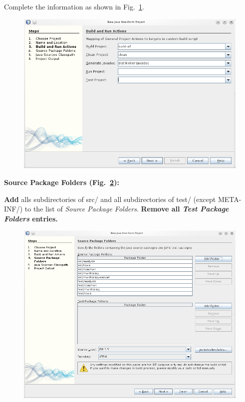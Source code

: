\begin{compactenum}
\begin{compactenum}
Complete the information as shown in Fig.~\ref{fig:nb:buildRun}.

\begin{figure}[H]\centering
\includegraphics[scale=0.5]{figures/netbeans-BuildAndRun}
\caption{}
\label{fig:nb:buildRun}
\end{figure}

\item \textbf{Source Package Folders (Fig.~\ref{fig:nb:sourcePackageFolders}):} %

\textbf{Add} alls subdirectories of src/ and all subdirectories of test/ (except META-INF/) to 
the list of \textit{Source Package Folders}. \textbf{Remove all \textit{Test Package Folders} entries.}

\begin{figure}[H]\centering
\includegraphics[scale=0.5]{figures/netbeans-SourcePackageFolders}
\caption{}
\label{fig:nb:sourcePackageFolders}
\end{figure}


\end{compactenum}
\end{compactenum}
